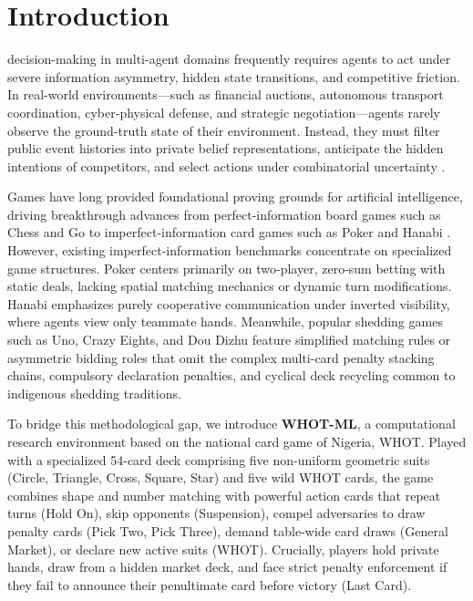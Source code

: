 \documentclass[journal]{IEEEtran}
\begin{document}
\section{Introduction}
 decision-making in multi-agent domains frequently requires agents to act under severe information asymmetry, hidden state transitions, and competitive friction. In real-world environments—such as financial auctions, autonomous transport coordination, cyber-physical defense, and strategic negotiation—agents rarely observe the ground-truth state of their environment. Instead, they must filter public event histories into private belief representations, anticipate the hidden intentions of competitors, and select actions under combinatorial uncertainty \cite{kaelbling1998planning,hansen2004dynamic}.

Games have long provided foundational proving grounds for artificial intelligence, driving breakthrough advances from perfect-information board games such as Chess and Go \cite{silver2018general} to imperfect-information card games such as Poker \cite{bowling2015heads,moravcik2017deepstack,brown2018superhuman,brown2019superhuman} and Hanabi \cite{bard2020hanabi}. However, existing imperfect-information benchmarks concentrate on specialized game structures. Poker centers primarily on two-player, zero-sum betting with static deals, lacking spatial matching mechanics or dynamic turn modifications. Hanabi emphasizes purely cooperative communication under inverted visibility, where agents view only teammate hands. Meanwhile, popular shedding games such as Uno, Crazy Eights, and Dou Dizhu \cite{zha2020rlcard,zha2021douzero} feature simplified matching rules or asymmetric bidding roles that omit the complex multi-card penalty stacking chains, compulsory declaration penalties, and cyclical deck recycling common to indigenous shedding traditions.

To bridge this methodological gap, we introduce \textbf{WHOT-ML}, a computational research environment based on the national card game of Nigeria, WHOT. Played with a specialized 54-card deck comprising five non-uniform geometric suits (Circle, Triangle, Cross, Square, Star) and five wild WHOT cards, the game combines shape and number matching with powerful action cards that repeat turns (Hold On), skip opponents (Suspension), compel adversaries to draw penalty cards (Pick Two, Pick Three), demand table-wide card draws (General Market), or declare new active suits (WHOT). Crucially, players hold private hands, draw from a hidden market deck, and face strict penalty enforcement if they fail to announce their penultimate card before victory (Last Card). 
\end{document}
